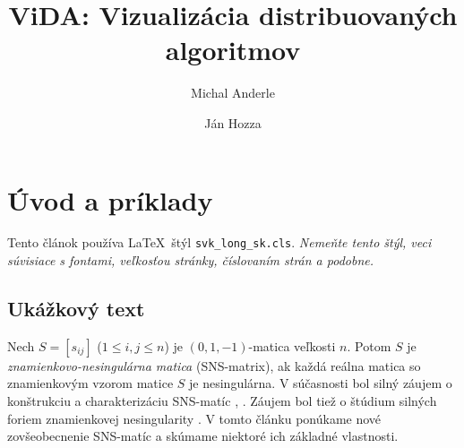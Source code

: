 \documentclass{svk_long_sk}
\begin{document}
\title{ViDA: Vizualizácia distribuovaných algoritmov}

\author{Michal Anderle
\and 
Ján Hozza
}




\maketitle




\section{Úvod a príklady}

Tento článok používa \LaTeX\ štýl {\tt svk\_long\_sk.cls}.
\emph{Nemeňte tento štýl, veci súvisiace s fontami,
veľkosťou stránky, číslovaním strán a podobne.}

\subsection{Ukážkový text}
Nech $S=[s_{ij}]$ ($1\leq i,j\leq n$) je $(0,1,-1)$-matica
veľkosti $n$. Potom $S$ je {\em znamienkovo-nesingulárna matica}
(SNS-matrix), ak každá reálna matica so znamienkovým vzorom
matice $S$ je nesingulárna. V súčasnosti bol silný záujem
o konštrukciu a charakterizáciu
SNS-matíc \cite{bs}, \cite{klm}. Záujem bol tiež o štúdium silných foriem
znamienkovej nesingularity \cite{djd}. V tomto článku ponúkame
nové zovšeobecnenie SNS-matíc a skúmame niektoré ich základné vlastnosti.
 
\end{document}
